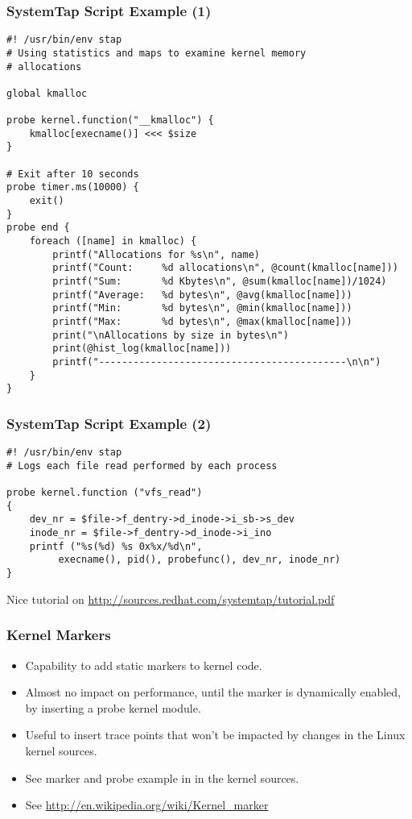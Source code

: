 \begin{frame}[fragile]
  \frametitle{SystemTap Script Example (1)}
{\tiny
\begin{verbatim}
#! /usr/bin/env stap
# Using statistics and maps to examine kernel memory
# allocations

global kmalloc

probe kernel.function("__kmalloc") {
    kmalloc[execname()] <<< $size
}

# Exit after 10 seconds
probe timer.ms(10000) {
    exit()
}
probe end {
    foreach ([name] in kmalloc) {
        printf("Allocations for %s\n", name)
        printf("Count:     %d allocations\n", @count(kmalloc[name]))
        printf("Sum:       %d Kbytes\n", @sum(kmalloc[name])/1024)
        printf("Average:   %d bytes\n", @avg(kmalloc[name]))
        printf("Min:       %d bytes\n", @min(kmalloc[name]))
        printf("Max:       %d bytes\n", @max(kmalloc[name]))
        print("\nAllocations by size in bytes\n")
        print(@hist_log(kmalloc[name]))
        printf("-------------------------------------------\n\n")
    }
}
\end{verbatim}
}
\end{frame}

\begin{frame}[fragile]
  \frametitle{SystemTap Script Example (2)}
{\small
\begin{verbatim}
#! /usr/bin/env stap
# Logs each file read performed by each process

probe kernel.function ("vfs_read")
{
    dev_nr = $file->f_dentry->d_inode->i_sb->s_dev
    inode_nr = $file->f_dentry->d_inode->i_ino
    printf ("%s(%d) %s 0x%x/%d\n",
         execname(), pid(), probefunc(), dev_nr, inode_nr)
}
\end{verbatim}
}
Nice tutorial on \url{http://sources.redhat.com/systemtap/tutorial.pdf}
\end{frame}

\begin{frame}
  \frametitle{Kernel Markers}
  \begin{itemize}
  \item Capability to add static markers to kernel code.
  \item Almost no impact on performance, until the marker is
    dynamically enabled, by inserting a probe kernel module.
  \item Useful to insert trace points that won't be impacted by
    changes in the Linux kernel sources.
  \item See marker and probe example in  in the
    kernel sources.
  \item See \url{http://en.wikipedia.org/wiki/Kernel_marker}
  \end{itemize}
\end{frame}

